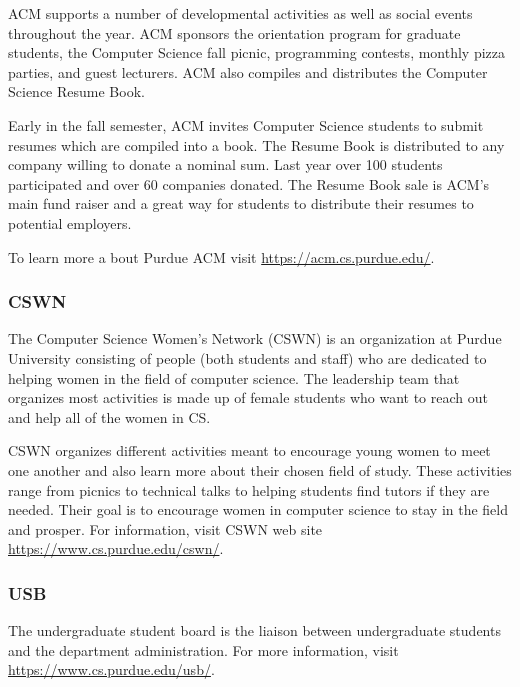 ACM supports a number of developmental activities as well as social events throughout the year. ACM sponsors the orientation program for graduate students, the Computer Science fall picnic, programming contests, monthly pizza parties, and guest lecturers. ACM also compiles and distributes the Computer Science Resume Book.

Early in the fall semester, ACM invites Computer Science students to submit resumes which are compiled into a book. The Resume Book is distributed to any company willing to donate a nominal sum. Last year over 100 students participated and over 60 companies donated. The Resume Book sale is ACM's main fund raiser and a great way for students to distribute their resumes to potential employers.

To learn more a bout Purdue ACM visit \url{https://acm.cs.purdue.edu/}.



\subsubsection{CSWN}
The Computer Science Women's Network (CSWN) is an organization at Purdue University consisting of people (both students and staff) who are dedicated to helping women in the field of computer science. The leadership team that organizes most activities is made up of female students who want to reach out and help all of the women in CS.

CSWN organizes different activities meant to encourage young women to meet one another and also learn more about their chosen field of study. These activities range from picnics to technical talks to helping students find tutors if they are needed. Their goal is to encourage women in computer science to stay in the field and prosper. For information, visit CSWN web site \url{https://www.cs.purdue.edu/cswn/}.



\subsubsection{USB}
The undergraduate student board is the liaison between undergraduate students and the department administration. For more information, visit \url{https://www.cs.purdue.edu/usb/}.





